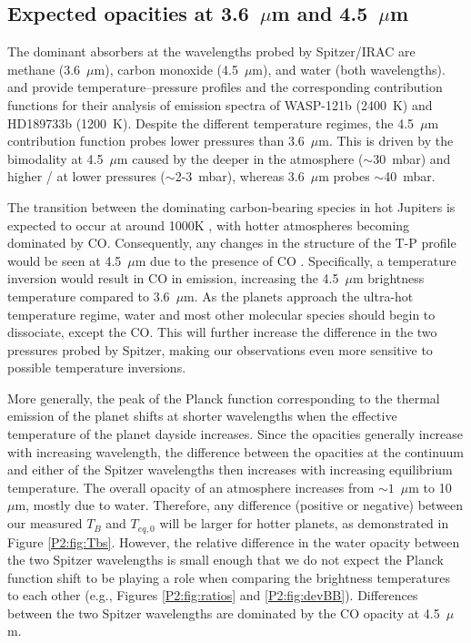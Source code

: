 \subsection{Expected opacities at 3.6~$\mu$m and 4.5~$\mu$m}

The dominant absorbers at the wavelengths probed by Spitzer/IRAC are methane (3.6~$\mu$m), carbon monoxide (4.5~$\mu$m), and water (both wavelengths). \citet{Parmentier2018} and \citet{Lee2012} provide temperature--pressure profiles and the corresponding contribution functions for their analysis of emission spectra of WASP-121b (2400~K) and HD189733b (1200~K). Despite the different temperature regimes, the 4.5~$\mu$m contribution function probes lower pressures than 3.6~$\mu$m. This is driven by the bimodality at 4.5~$\mu$m caused by the  deeper in the atmosphere ($\sim$30~mbar) and higher  /  at lower pressures ($\sim$2-3~mbar), whereas 3.6~$\mu$m probes $\sim$40~mbar.

The transition between the dominating carbon-bearing species in hot Jupiters is expected to occur at around 1000K \citep[e.g.,][]{Zahnle2014, Ebbing2016, Molaverdikhani2019}, with hotter atmospheres becoming dominated by CO. Consequently, any changes in the structure of the T-P profile would be seen at 4.5~$\mu$m due to the presence of CO \citep{Fortney2008, Parmentier2018, Arcangeli2018}. Specifically, a temperature inversion would result in CO in emission, increasing the 4.5~$\mu$m brightness temperature compared to 3.6~$\mu$m. As the planets approach the ultra-hot temperature regime, water and most other molecular species should begin to dissociate, except the CO. This will further increase the difference in the two pressures probed by Spitzer, making our observations even more sensitive to possible temperature inversions.

More generally, the peak of the Planck function corresponding to the thermal emission of the planet shifts at shorter wavelengths when the effective temperature of the planet dayside increases. Since the opacities generally increase with increasing wavelength, the difference between the opacities at the continuum and either of the Spitzer wavelengths then increases with increasing equilibrium temperature. The overall opacity of an atmosphere increases from $\sim1$~$\mu$m to 10~$\mu$m, mostly due to water. Therefore, any difference (positive or negative) between our measured $T_B$ and $T_{eq,\textit{0}}$ will be larger for hotter planets, as demonstrated in Figure \ref{P2:fig:Tbs}. However, the relative difference in the water opacity between the two Spitzer wavelengths is small enough that we do not expect the Planck function shift to be playing a role when comparing the brightness temperatures to each other (e.g., Figures \ref{P2:fig:ratios} and \ref{P2:fig:devBB}). Differences between the two Spitzer wavelengths are dominated by the CO opacity at 4.5~$\mu$m.

